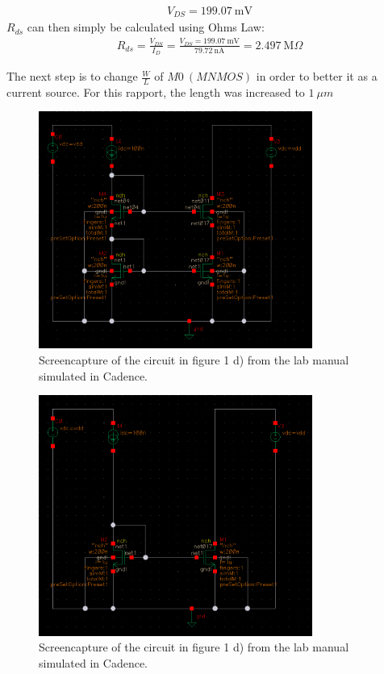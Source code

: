 \documentclass[onecolumn]{article}
\begin{document}
\begin{align}
    V_{DS} = 199.07 \ \text{mV} \nonumber
\end{align}
$R_{ds}$ can then simply be calculated using Ohms Law:
\begin{align}
    R_{ds} = \frac{V_{DS}}{I_D} = \frac{V_{DS} = 199.07 \ \text{mV}}{79.72 \ \text{nA}} = 2.497 \ \text{M}\Omega
\end{align}

The next step is to change $\frac{W}{L}$ of $M0 \ (MNMOS)$  in order to better it as a current source. For this rapport, the length was increased to $1 \  \mu m$ 
\begin{figure}[h!]
    \centering
    \includegraphics[width=0.8\textwidth]{circuit_d_cascode.png}
    \caption{Screencapture of the circuit in figure 1 d) from the lab manual simulated in Cadence.}
    \label{fig:circuitd}
\end{figure}

\begin{figure}[h!]
    \centering
    \includegraphics[width=0.8\textwidth]{circuit_d_simple.png}
    \caption{Screencapture of the circuit in figure 1 d) from the lab manual simulated in Cadence.}
    \label{fig:circuitdsimple}
\end{figure}
\end{document}
